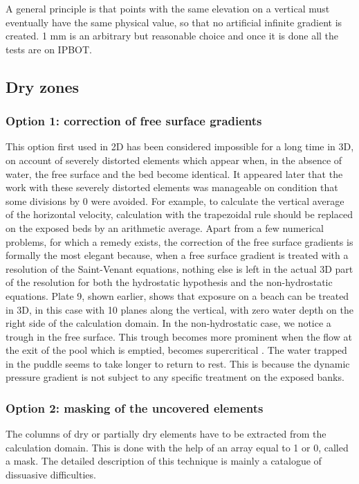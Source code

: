 A general principle is that points with the same elevation on a vertical must
eventually have the same physical value, so that no artificial infinite
gradient is created. 1 mm is an arbitrary but reasonable choice and once it is
done all the tests are on IPBOT.

\subsection{Dry zones}

\subsubsection{Option 1: correction of free surface gradients}

This option first used in 2D has been considered impossible for a long time in
3D, on account of severely distorted elements which appear when, in the
absence of water, the free surface and the bed become identical. It
appeared later that the work with these severely distorted elements was
manageable on condition that some divisions by 0 were avoided. For example, to
calculate the vertical average of the horizontal velocity, calculation with
the trapezoidal rule should be replaced on the exposed beds by an arithmetic
average. Apart from a few numerical problems, for which a remedy exists, the
correction of the free surface gradients is formally the most elegant because,
when a free surface gradient is treated with a resolution of the Saint-Venant
equations, nothing else is left in the actual 3D part of the resolution for
both the hydrostatic hypothesis and the non-hydrostatic equations. Plate 9,
shown earlier, shows that exposure on a beach can be treated in 3D, in this
case with 10 planes along the vertical, with zero water depth on the right
side of the calculation domain. In the non-hydrostatic case, we notice a
trough in the free surface. This trough becomes more prominent when the flow
at the exit of the pool which is emptied, becomes supercritical%
%
. The water trapped in the puddle seems to take longer to return to rest. This
is because the dynamic pressure gradient is not subject to any specific
treatment on the exposed banks.

\subsubsection{Option 2: masking of the uncovered elements}

The columns of dry or partially dry elements have to be extracted from the
calculation domain. This is done with the help of an array equal to 1 or 0,
called a mask. The detailed description of this technique is mainly a
catalogue of dissuasive difficulties.

